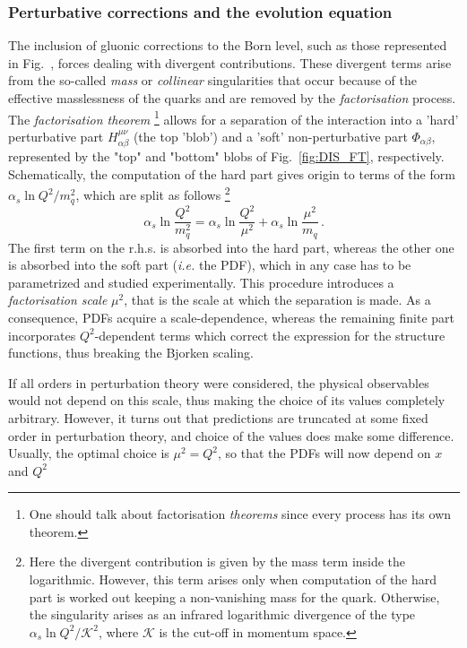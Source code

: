 \subsubsection*{Perturbative corrections and the evolution equation}
The inclusion of gluonic corrections to the Born level, such as those represented in Fig.~, forces dealing with divergent contributions. These divergent terms arise from the so-called \textit{mass} or \textit{collinear} singularities that occur because of the effective masslessness of the quarks and are removed by the \textit{factorisation} process. The \textit{factorisation theorem} 
\footnote{One should talk about factorisation \textit{theorems} since every process has its own theorem.}
\cite{Collins:1989gx} allows for a separation of the interaction into a 'hard' perturbative part $H^{\mu \nu}_{\alpha \beta}$ (the top 'blob') and a 'soft' non-perturbative part $\Phi_{\alpha \beta}$, represented by the "top" and "bottom" blobs of Fig.~\ref{fig:DIS_FT}, respectively. Schematically, the computation of the hard part gives origin to terms of the form $\alpha_{s} \ln Q^2/m_q^2$, which are split as follows
\footnote{Here the divergent contribution is given by the mass term inside the logarithmic. However, this term arises only when computation of the hard part is worked out keeping a non-vanishing mass for the quark. Otherwise, the singularity arises as an infrared logarithmic divergence of the type $\alpha_{s} \ln Q^2/\mathcal{K}^2$, where $\mathcal{K}$ is the cut-off in momentum space.}
\begin{equation}
  \alpha_{s} \ln \frac{Q^2}{m_q^2} = \alpha_{s} \ln \frac{Q^2}{\mu^2} + \alpha_{s} \ln \frac{\mu^2}{m_{q}} \,.
\end{equation}
The first term on the r.h.s. is absorbed into the hard part, whereas the other one is absorbed into the soft part (\textit{i.e.} the PDF), which in any case has to be parametrized and studied experimentally. This procedure introduces a \textit{factorisation scale} $\mu^2$, that is the scale at which the separation is made. As a consequence, PDFs acquire a scale-dependence, whereas the remaining finite part incorporates $Q^2$-dependent terms which correct the expression for the structure functions, thus breaking the Bjorken scaling. \par
If all orders in perturbation theory were considered, the physical observables would not depend on this scale, thus making the choice of its values completely arbitrary. However, it turns out that predictions are truncated at some fixed order in perturbation theory, and choice of the values does make some difference. Usually, the optimal choice is $\mu^2 = Q^2$, so that the PDFs will now depend on $x$ and $Q^2$
